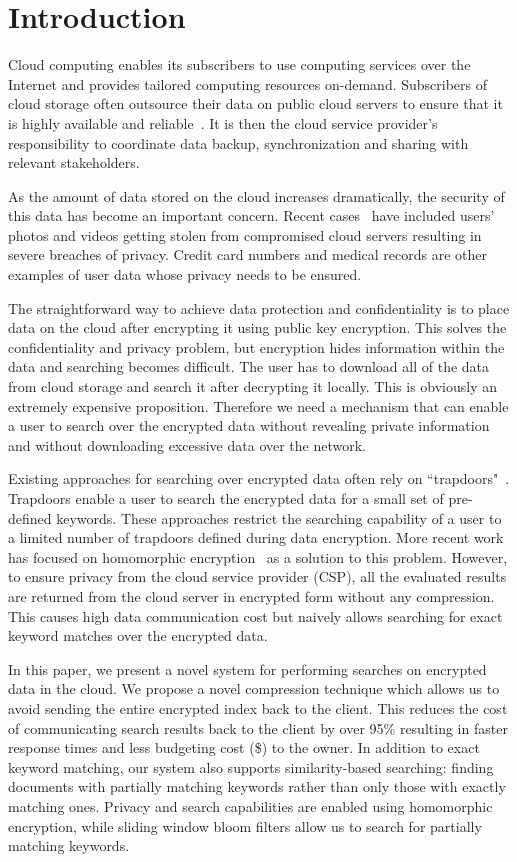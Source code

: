 \section{Introduction}

Cloud computing enables its subscribers to use computing services over the 
Internet and provides tailored computing resources on-demand. 
Subscribers of cloud storage often outsource their data on public cloud servers
to ensure that it is highly available and reliable~\cite{wang2012toward}. 
It is then the cloud service provider's
responsibility to coordinate data backup, synchronization and sharing
with relevant stakeholders. 

As the amount of data stored on the cloud increases dramatically, the security 
of this data has become an important concern. Recent cases~\cite{top_threats}
have included users' photos and videos getting stolen from compromised cloud servers resulting in
severe breaches of privacy. Credit card numbers and medical
records are other examples of user data whose privacy needs to be ensured.

The straightforward way to achieve data protection and confidentiality is to
place data on the cloud after encrypting it using public key encryption.
This solves the confidentiality and privacy problem,
but encryption hides information within the data and searching becomes difficult. The user
has to download all of the data from cloud storage and search it after decrypting it locally. 
This is
obviously an extremely expensive proposition. Therefore we need a mechanism 
that can enable a user to search over the encrypted data without revealing 
private information and without downloading excessive data over the network.

Existing approaches for searching over encrypted data often rely on
``trapdoors"~\cite{song,goh2003secure,boneh}. 
Trapdoors enable a user to search the encrypted data for a small 
set of pre-defined keywords. These approaches restrict the searching
capability of a user to a limited number of trapdoors defined during data 
encryption. More recent work has focused on homomorphic encryption~\cite{craig,zeehan} as a solution
to this problem. However, to ensure privacy from the cloud service provider (CSP), 
all the evaluated results
are returned from the cloud server in encrypted form without any compression. This causes high data
communication cost but naively allows searching for exact keyword matches over the encrypted data.

In this paper, we present a novel system for performing searches on encrypted 
data in the cloud. We propose a novel compression technique which allows us to
avoid sending the entire encrypted index back to the client. This reduces
the cost of communicating search results back to the client by over 95\% resulting in 
faster response times and less budgeting cost (\$) to the owner. 
In addition to exact keyword matching, our system also
supports similarity-based searching: finding documents with partially matching 
keywords rather than only those with exactly matching ones. Privacy and search 
capabilities are enabled using homomorphic encryption, while sliding window 
bloom filters allow us to search for partially matching keywords. 

